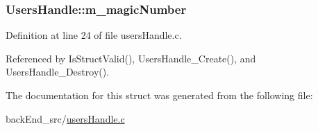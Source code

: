 \subsubsection[{\texorpdfstring{m\+\_\+magic\+Number}{m_magicNumber}}]{ Users\+Handle\+::m\+\_\+magic\+Number}\hypertarget{structUsersHandle_a9f927935bd48bcc7e161705148612c81}{}\label{structUsersHandle_a9f927935bd48bcc7e161705148612c81}


Definition at line 24 of file users\+Handle.\+c.



Referenced by Is\+Struct\+Valid(), Users\+Handle\+\_\+\+Create(), and Users\+Handle\+\_\+\+Destroy().



The documentation for this struct was generated from the following file\+:\begin{DoxyCompactItemize}
\item 
back\+End\+\_\+src/\hyperlink{usersHandle_8c}{users\+Handle.\+c}\end{DoxyCompactItemize}
